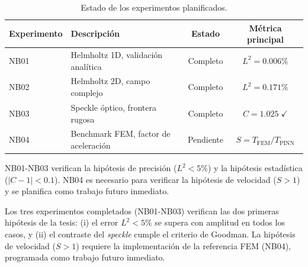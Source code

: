 \begin{table}[htbp]
\centering
\begin{threeparttable}
\caption{Estado de los experimentos planificados.}
\label{tab:resumen_experimentos}
\begin{tabular}{llcc}
\toprule
Experimento & Descripción & Estado & Métrica principal \\
\midrule
NB01 & Helmholtz 1D, validación analítica & Completo & $L^2 = 0.006\%$ \\
NB02 & Helmholtz 2D, campo complejo       & Completo & $L^2 = 0.171\%$ \\
NB03 & Speckle óptico, frontera rugosa    & Completo & $C = 1.025\;\checkmark$ \\
NB04 & Benchmark FEM, factor de aceleración & Pendiente & $S = T_\text{FEM}/T_\text{PINN}$ \\
\bottomrule
\end{tabular}
\begin{tablenotes}\small
    \item NB01-NB03 verifican la hipótesis de precisión ($L^2 < 5\%$) y la
    hipótesis estadística ($|C - 1| < 0.1$). NB04 es necesario para
    verificar la hipótesis de velocidad ($S > 1$) y se planifica como trabajo
    futuro inmediato.
\end{tablenotes}
\end{threeparttable}
\end{table}

Los tres experimentos completados (NB01-NB03) verifican las dos primeras
hipótesis de la tesis: (i) el error $L^2 < 5\%$ se supera con amplitud en todos
los casos, y (ii) el contraste del \textit{speckle} cumple el criterio de
Goodman. La hipótesis de velocidad ($S > 1$) requiere la implementación de la
referencia FEM (NB04), programada como trabajo futuro inmediato.
